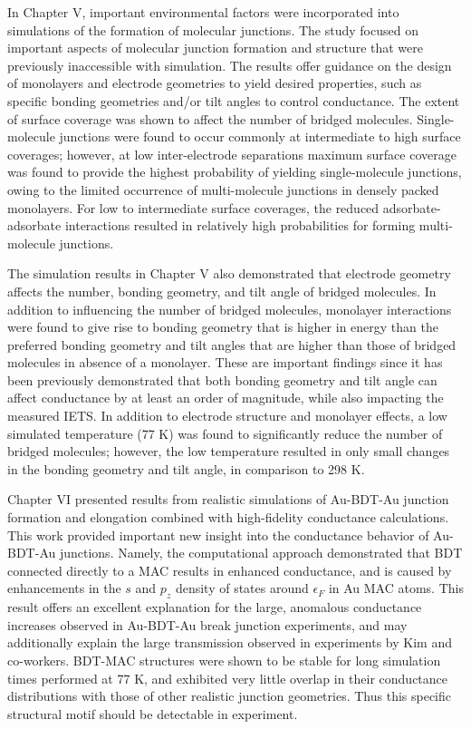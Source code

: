 \documentclass[10pt]{report}  %
\begin{document}
In Chapter V, important environmental factors were incorporated into simulations of the formation of molecular junctions. The study focused on important aspects of molecular junction formation and structure that were previously inaccessible with simulation. The results offer guidance on the design of monolayers and electrode geometries to yield desired properties, such as specific bonding geometries and/or tilt angles to control conductance. The extent of surface coverage was shown to affect the number of bridged molecules.  Single-molecule junctions were found to occur commonly at intermediate to high surface coverages; however, at low inter-electrode separations maximum surface coverage was found to provide the highest probability of yielding single-molecule junctions, owing to the limited occurrence of multi-molecule junctions in densely packed monolayers.  For low to intermediate surface coverages, the reduced adsorbate-adsorbate interactions resulted in relatively high probabilities for forming multi-molecule junctions.  

The simulation results in Chapter V also demonstrated that electrode geometry affects the number, bonding geometry, and tilt angle of bridged molecules.  In addition to influencing the number of bridged molecules, monolayer interactions were found to give rise to bonding geometry that is higher in energy than the preferred bonding geometry and tilt angles that are higher than those of bridged molecules in absence of a monolayer.  These are important findings since it has been previously demonstrated that both bonding geometry and tilt angle can affect conductance by at least an order of magnitude,\cite{Tsutsui:2006,Kim:2011,Bratkovsky:2003,Haiss:2008} while also impacting the measured IETS. \cite{Lin:2011}  In addition to electrode structure and monolayer effects, a low simulated temperature (77 K) was found to significantly reduce the number of bridged molecules; however, the low temperature resulted in only small changes in the bonding geometry and tilt angle, in comparison to 298 K.  

Chapter VI presented results from realistic simulations of Au-BDT-Au junction formation and elongation combined with high-fidelity conductance calculations. This work provided important new insight into the conductance behavior of Au-BDT-Au junctions. Namely, the computational approach demonstrated that BDT connected directly to a MAC results in enhanced conductance, and is caused by enhancements in the $s$ and $p_{z}$ density of states around $\epsilon_{F}$ in Au MAC atoms. This result offers an excellent explanation for the large, anomalous conductance increases observed in Au-BDT-Au break junction experiments, \cite{Bruot:2012} and may additionally explain the large transmission observed in experiments by Kim and co-workers. \cite{Kim:2011} BDT-MAC structures were shown to be stable for long simulation times performed at 77 K, and exhibited very little overlap in their conductance distributions with those of other realistic junction geometries. Thus this specific structural motif should be detectable in experiment. 
\end{document}

